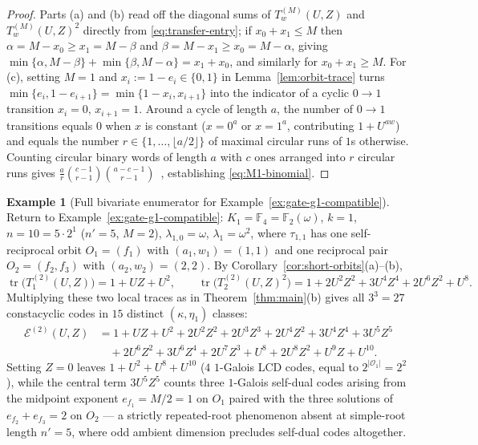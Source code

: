 \documentclass[preprint,12pt]{elsarticle}
\newcommand{\F}{\mathbb F}
\newcommand{\Epoly}{\mathscr E}
\newcommand{\tr}{\operatorname{tr}}
\numberwithin{equation}{section}
\theoremstyle{plain}
\theoremstyle{definition}
\newtheorem{example}[theorem]{Example}
\theoremstyle{remark}
\begin{document}
\begin{proof}
Parts \textup{(a)} and \textup{(b)} read off the diagonal sums of
$T_w^{(M)}(U,Z)$ and $T_w^{(M)}(U,Z)^2$ directly from \eqref{eq:transfer-entry};
if $x_0+x_1\le M$ then $\alpha=M-x_0\ge x_1=M-\beta$ and $\beta=M-x_1\ge x_0=M-\alpha$,
giving $\min\{\alpha,M-\beta\}+\min\{\beta,M-\alpha\}=x_1+x_0$, and similarly for
$x_0+x_1\ge M$. For \textup{(c)}, setting $M=1$ and $x_i:=1-e_i\in\{0,1\}$ in
Lemma~\ref{lem:orbit-trace} turns $\min\{e_i,1-e_{i+1}\}=\min\{1-x_i,x_{i+1}\}$
into the indicator of a cyclic $0\to 1$ transition $x_i=0,\,x_{i+1}=1$. Around a
cycle of length $a$, the number of $0\to 1$ transitions equals $0$ when $x$ is
constant ($x=0^a$ or $x=1^a$, contributing $1+U^{aw}$) and equals the number
$r\in\{1,\dots,\lfloor a/2\rfloor\}$ of maximal circular runs of $1$s otherwise.
Counting circular binary words of length $a$ with $c$ ones arranged into $r$
circular runs gives $\frac{a}{r}\binom{c-1}{r-1}\binom{a-c-1}{r-1}$~\cite{vanLintWilson2001},
establishing \eqref{eq:M1-binomial}.
\end{proof}

\begin{example}[Full bivariate enumerator for Example~\ref{ex:gate-g1-compatible}]\label{ex:gate-g1-enumerator}
Return to Example~\ref{ex:gate-g1-compatible}: $K_1=\F_4=\F_2(\omega)$, $k=1$,
$n=10=5\cdot 2^1$ ($n'=5$, $M=2$), $\lambda_{1,0}=\omega$, $\lambda_1=\omega^2$,
where $\tau_{1,1}$ has one self-reciprocal orbit $O_1=(f_1)$ with $(a_1,w_1)=(1,1)$
and one reciprocal pair $O_2=(f_2,f_3)$ with $(a_2,w_2)=(2,2)$. By
Corollary~\ref{cor:short-orbits}\textup{(a)}--\textup{(b)},
\[
\tr\!\bigl(T_1^{(2)}(U,Z)\bigr)=1+UZ+U^2,
\qquad
\tr\!\bigl(T_2^{(2)}(U,Z)^2\bigr)=1+2U^2Z^2+3U^4Z^4+2U^6Z^2+U^8.
\]
Multiplying these two local traces as in Theorem~\ref{thm:main}\textup{(b)} gives
all $3^3=27$ constacyclic codes in $15$ distinct $(\kappa,\eta_1)$ classes:
\begin{align*}
\Epoly^{(2)}(U,Z)
 &=1+UZ+U^2+2U^2Z^2+2U^3Z^3+2U^4Z^2+3U^4Z^4+3U^5Z^5 \\
 &\quad +2U^6Z^2+3U^6Z^4+2U^7Z^3+U^8+2U^8Z^2+U^9Z+U^{10}.
\end{align*}
Setting $Z=0$ leaves $1+U^2+U^8+U^{10}$ ($4$ $1$-Galois LCD codes, equal to
$2^{|\mathcal O_1|}=2^2$), while the central term $3U^5Z^5$ counts three
$1$-Galois self-dual codes arising from the midpoint exponent $e_{f_1}=M/2=1$ on
$O_1$ paired with the three solutions of $e_{f_2}+e_{f_3}=2$ on $O_2$ — a
strictly repeated-root phenomenon absent at simple-root length $n'=5$, where odd
ambient dimension precludes self-dual codes altogether.
\end{example}
\end{document}
